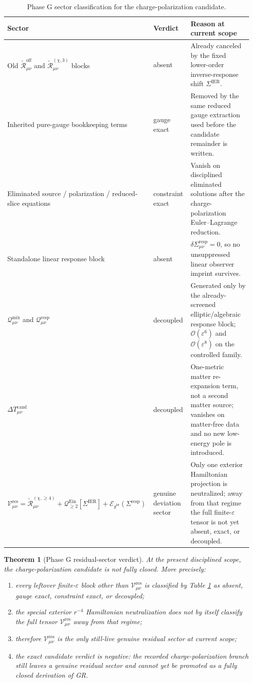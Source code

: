 \documentclass[11pt]{article}
\newcommand{\ObserverMetric}{g^{\mathrm{br}}}
\newcommand{\BaseShift}{\Sigma^{\mathrm{IER}}}
\newcommand{\ResponseShift}{\Sigma^{\mathrm{resp}}}
\newcommand{\ReOff}{\widetilde{\mathcal R}_{\mu\nu}^{\mathrm{off}}}
\newcommand{\ReLongThree}{\widetilde{\mathcal R}_{\mu\nu}^{(\chi,3)}}
\newcommand{\ReLongFour}{\widetilde{\mathcal R}_{\mu\nu}^{(\chi,\ge 4)}}
\newcommand{\DeltaTCand}{\Delta T_{\mu\nu}^{\mathrm{cand}}}
\newcommand{\EinLin}{\mathcal E_{\ObserverMetric}}
\newcommand{\EinQuad}{\mathcal Q_{\ge 2}^{\mathrm{Ein}}}
\newcommand{\MixQuad}{\mathcal Q_{\mu\nu}^{\mathrm{mix}}}
\newcommand{\RespQuad}{\mathcal Q_{\mu\nu}^{\mathrm{resp}}}
\newcommand{\ResidualCore}{\mathcal V_{\mu\nu}^{\mathrm{res}}}
\newcommand{\epsIR}{\varepsilon}
\newtheorem{theorem}{Theorem}
\begin{document}
\begin{table}[t]
\centering
\begin{tabular}{p{}p{}p{}}
\toprule
\textbf{Sector} & \textbf{Verdict} & \textbf{Reason at current scope} \\
\midrule
Old \(\ReOff\) and \(\ReLongThree\) blocks & absent & Already canceled by the fixed lower-order inverse-response shift \(\BaseShift\). \\
Inherited pure-gauge bookkeeping terms & gauge exact & Removed by the same reduced gauge extraction used before the candidate remainder is written. \\
Eliminated source / polarization / reduced-slice equations & constraint exact & Vanish on disciplined eliminated solutions after the charge-polarization Euler--Lagrange reduction. \\
Standalone linear response block & absent & \(\delta\ResponseShift_{\mu\nu}=0\), so no unsuppressed linear observer imprint survives. \\
\(\MixQuad\) and \(\RespQuad\) & decoupled & Generated only by the already-screened elliptic/algebraic response block; \(\mathcal O(\epsIR^6)\) and \(\mathcal O(\epsIR^8)\) on the controlled family. \\
\(\DeltaTCand\) & decoupled & One-metric matter re-expansion term, not a second matter source; vanishes on matter-free data and no new low-energy pole is introduced. \\
\(\ResidualCore=\ReLongFour+\EinQuad[\BaseShift]+\EinLin(\ResponseShift)\) & genuine deviation sector & Only one exterior Hamiltonian projection is neutralized; away from that regime the full finite-\(\epsIR\) tensor is not yet absent, exact, or decoupled. \\
\bottomrule
\end{tabular}
\caption{Phase G sector classification for the charge-polarization candidate.}
\label{tab:phaseg}
\end{table}

\begin{theorem}[Phase G residual-sector verdict]
\label{thm:phaseg}
At the present disciplined scope, the charge-polarization candidate is \emph{not} fully closed. More precisely:
\begin{enumerate}
    \item every leftover finite-\(\epsIR\) block other than \(\ResidualCore\) is classified by Table \ref{tab:phaseg} as absent, gauge exact, constraint exact, or decoupled;
    \item the special exterior \(r^{-4}\) Hamiltonian neutralization does not by itself classify the full tensor \(\ResidualCore\) away from that regime;
    \item therefore \(\ResidualCore\) is the only still-live genuine residual sector at current scope;
    \item the exact candidate verdict is negative: the recorded charge-polarization branch still leaves a genuine residual sector and cannot yet be promoted as a fully closed derivation of GR.
\end{enumerate}
\end{theorem}
\end{document}
